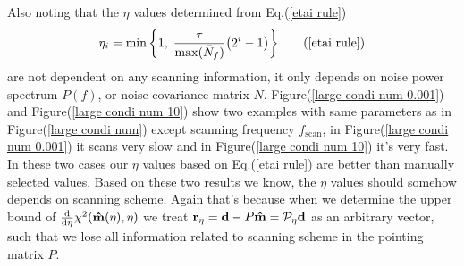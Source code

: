 \documentclass[11pt, letterpaper]{article}
\newcommand{\vbd}{\vb{d}}
\newcommand{\hatm}{\vb{\hat{m}}}
\newcommand{\Nbar}{\bar{N}}
\begin{document}
Also noting that the $\eta$ values determined from Eq.(\ref{etai rule})
\begin{align}
\eta_i =\min \qty\bigg{1,\; \frac{\tau}{\max(\Nbar_f)} \qty(2^i -1) } 
\tag{\ref{etai rule}}
\end{align}
are not dependent on any scanning information,
it only depends on noise power spectrum $P(f)$, or noise covariance matrix $N$.
Figure(\ref{large condi num 0.001}) and Figure(\ref{large condi num 10}) show
two examples with same parameters as in Figure(\ref{large condi num}) except 
scanning frequency $f_{\text{scan}}$, in Figure(\ref{large condi num 0.001}) it
scans very slow and in Figure(\ref{large condi num 10}) it's very fast.
In these two cases our $\eta$ values based on Eq.(\ref{etai rule}) are better
than manually selected values.
Based on these two results we know, the $\eta$ values should somehow depends
on scanning scheme.
Again that's because when we determine the upper bound of 
$\dv{\eta} \chi^2(\hatm(\eta), \eta)$ we treat
$\vb{r}_{\eta} = \vbd - P\hatm = \mathcal{P}_{\eta} \vbd$
as an arbitrary vector, such that we lose all information related to scanning 
scheme in the pointing matrix $P$.
\end{document}
